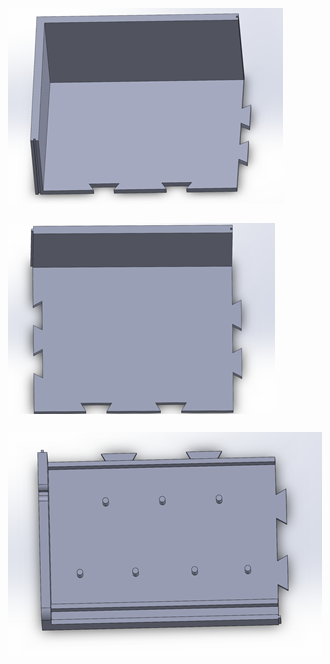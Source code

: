 \begin{figure}[h!]
    \centering
    \begin{subfigure}[b]{0.45\textwidth}
      \centering
      \includegraphics[width=\textwidth]{image/BodyModel3.png}
    \end{subfigure}
    \begin{subfigure}[b]{0.45\textwidth}
      \centering
      \includegraphics[width=\textwidth]{image/BodyModel4.png}
    \end{subfigure}
    \begin{subfigure}[b]{0.45\textwidth}
      \centering
      \includegraphics[width=\textwidth]{image/BodyModel5.png}

\end{subfigure}
\end{figure}
